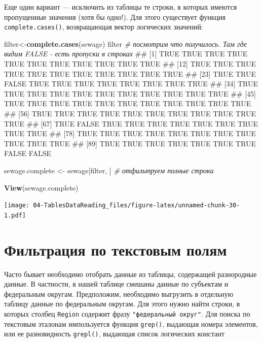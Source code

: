 \documentclass[]{book}
\newenvironment{Shaded}{\begin{snugshade}}{\end{snugshade}}
\newcommand{\KeywordTok}[1]{\textcolor[rgb]{0.13,0.29,0.53}{\textbf{#1}}}
\newcommand{\StringTok}[1]{\textcolor[rgb]{0.31,0.60,0.02}{#1}}
\newcommand{\CommentTok}[1]{\textcolor[rgb]{0.56,0.35,0.01}{\textit{#1}}}
\newcommand{\NormalTok}[1]{#1}
\begin{document}
Еще один вариант --- исключить из таблицы те строки, в которых имеются
пропущенные значения (хотя бы одно!). Для этого существует функция
\texttt{complete.cases()}, возвращающая вектор логических значений:

\begin{Shaded}
\begin{Highlighting}[]
\NormalTok{filter<-}\KeywordTok{complete.cases}\NormalTok{(sewage)}
\NormalTok{filter  }\CommentTok{# посмотрим что получилось. Там где видим FALSE - есть пропуски в строках}
\NormalTok{##  [1]  TRUE  TRUE  TRUE  TRUE  TRUE  TRUE  TRUE  TRUE  TRUE  TRUE  TRUE}
\NormalTok{## [12]  TRUE  TRUE  TRUE  TRUE  TRUE  TRUE  TRUE  TRUE  TRUE  TRUE  TRUE}
\NormalTok{## [23]  TRUE  TRUE FALSE  TRUE  TRUE  TRUE  TRUE  TRUE  TRUE  TRUE  TRUE}
\NormalTok{## [34]  TRUE  TRUE  TRUE  TRUE  TRUE  TRUE  TRUE  TRUE  TRUE  TRUE  TRUE}
\NormalTok{## [45]  TRUE  TRUE  TRUE  TRUE  TRUE  TRUE  TRUE  TRUE  TRUE  TRUE  TRUE}
\NormalTok{## [56]  TRUE  TRUE  TRUE  TRUE  TRUE  TRUE  TRUE  TRUE  TRUE  TRUE  TRUE}
\NormalTok{## [67]  TRUE FALSE  TRUE  TRUE  TRUE  TRUE  TRUE  TRUE  TRUE  TRUE  TRUE}
\NormalTok{## [78]  TRUE  TRUE  TRUE  TRUE  TRUE  TRUE  TRUE  TRUE  TRUE  TRUE  TRUE}
\NormalTok{## [89]  TRUE  TRUE  TRUE  TRUE  TRUE  TRUE  TRUE FALSE FALSE}

\NormalTok{sewage.complete <-}\StringTok{ }\NormalTok{sewage[filter, ] }\CommentTok{# отфильтруем полные строки}
\end{Highlighting}
\end{Shaded}

\begin{Shaded}
\begin{Highlighting}[]
\KeywordTok{View}\NormalTok{(sewage.complete)}
\end{Highlighting}
\end{Shaded}

\texttt{[image: 04-TablesDataReading\_files/figure-latex/unnamed-chunk-30-1.pdf]}

\section{Фильтрация по текстовым полям}\label{filtering_text}

Часто бывает необходимо отобрать данные из таблицы, содержащей
разнородные данные. В частности, в нашей таблице смешаны данные по
субъектам и федеральным округам. Предположим, необходимо выгрузить в
отдельную таблицу данные по федеральным округам. Для этого нужно найти
строки, в которых столбец \texttt{Region} содержит фразу
\texttt{"федеральный\ округ"}. Для поиска по текстовым эталонам
импользуется функция \texttt{grep()}, выдающая номера элементов, или ее
разновидность \texttt{grepl()}, выдающая список логических констант
\end{document}
